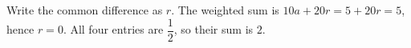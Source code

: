 Write the common difference as $r$. The weighted sum is $10a+20r=5+20r=5$, hence $r=0$. All four entries are $\dfrac{1}{2}$, so their sum is $\boxed2$.
